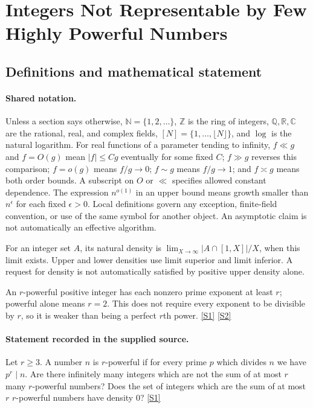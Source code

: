\documentclass[11pt,a4paper]{article}
\newcommand{\N}{\mathbb{N}}
\newcommand{\Z}{\mathbb{Z}}
\newcommand{\Q}{\mathbb{Q}}
\newcommand{\R}{\mathbb{R}}
\newcommand{\C}{\mathbb{C}}
\newcommand{\sref}[2]{\hyperlink{source:#1:#2}{[S#2]}}
\begin{document}
\section{Integers Not Representable by Few Highly Powerful Numbers}\label{statement}


\subsection{Definitions and mathematical statement}

\paragraph{Shared notation.}Unless a section says otherwise, $\N=\{1,2,\ldots\}$,
$\Z$ is the ring of integers, $\Q,\R,\C$ are the rational, real, and complex
fields, $[N]=\{1,\ldots,\lfloor N\rfloor\}$, and $\log$ is the natural
logarithm. For real functions of a parameter tending to infinity,
$f\ll g$ and $f=O(g)$ mean $|f|\leq Cg$ eventually for some fixed $C$;
$f\gg g$ reverses this comparison; $f=o(g)$ means $f/g\to0$;
$f\sim g$ means $f/g\to1$; and $f\asymp g$ means both order bounds.
A subscript on $O$ or $\ll$ specifies allowed constant dependence.
The expression $n^{o(1)}$ in an upper bound means growth smaller than
$n^\epsilon$ for each fixed $\epsilon>0$. Local definitions govern any
exception, finite-field convention, or use of the same symbol for another
object. An asymptotic claim is not automatically an effective algorithm.



For an integer set $A$, its natural density is $\lim_{X\to\infty}|A\cap[1,X]|/X$, when this limit exists. Upper and lower densities use limit superior and limit inferior. A request for density is not automatically satisfied by positive upper density alone.

An $r$-powerful positive integer has each nonzero prime exponent at least $r$; powerful alone means $r=2$. This does not require every exponent to be divisible by $r$, so it is weaker than being a perfect $r$th power. \sref{statement}{1} \sref{statement}{2}

\paragraph{Statement recorded in the supplied source.}
Let $r\geq 3$. A number $n$ is $r$-powerful if for every prime $p$ which divides $n$ we have $p^r\mid n$.
Are there infinitely many integers which are not the sum of at most $r$ many $r$-powerful numbers? Does the set of integers which are the sum of at most $r$ $r$-powerful numbers have density $0$? \sref{statement}{1}
\end{document}
